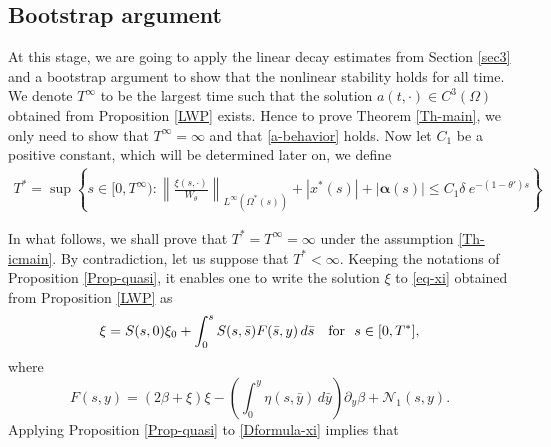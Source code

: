 \documentclass[12pt]{amsart}
\numberwithin{equation}{section}
\numberwithin{equation}{section}
\newcommand{\cpcomment}[1]{\ \newline\textcolor{darkblue}{+++++++++++++++++++++}\newline
\textcolor{darkblue}{#1}\newline\textcolor{darkblue}{+++++++++++++++++++++}\newline
}
\begin{document}
  

 \subsection{Bootstrap argument}
    

At this stage,  we are going to apply the  linear decay estimates from Section \ref{sec3} and a bootstrap argument to show that the nonlinear stability holds for all time.
   We denote  $T^\infty$  to be the largest time such that the solution $a(t,  \cdot)\in C^3(\Omega)$ obtained from Proposition \ref{LWP} exists.  Hence to prove Theorem \ref{Th-main},  we only need to show that $T^\infty=\infty$ and that \eqref{a-behavior} holds.  Now let $C_1$ be a  positive constant,  which will be determined later on,  we define  
   \begin{multline}\label{def-T*}
   T^*=\sup \left\{s\in[0, T^\infty):
   \left\| \frac{\xi(s,  \cdot)}{W_\theta}\right\|_{L^\infty(\Omega^*(s))} + |x^*(s)|+|\boldsymbol{\alpha}(s)|\leq  C_1 \delta  ~e^{-(1-\theta')s}\right \}
   \end{multline}
    
    In what follows, we shall prove that ${T^*=T^\infty}=\infty$ under the assumption \eqref{Th-icmain}.   By contradiction,   let us suppose that ${T^*<\infty}.$   %
   Keeping the notations of Proposition \ref{Prop-quasi},   it enables one to  write  the solution $\xi$ to \eqref{eq-xi} obtained from Proposition \ref{LWP} as 
    \begin{equation}\label{Dformula-xi}
    \xi= S(s, 0)\xi_0+ \int_0^s S(s,  \bar s) F(\bar s, y)\,d\bar s \quad{\rm for}~~s\in[0, T^*],
    \end{equation}
    where 
    \begin{equation*} 
F(s, y)= \left(2 \beta+\xi \right)\xi-
   \left(\int_{0}^y \eta(s, \bar y) \,d\bar y\right) \partial_y \beta+ \mathcal{N}_1(s, y).
\end{equation*}
   Applying  Proposition \ref{Prop-quasi} to \eqref{Dformula-xi} implies that 
    
\end{document}

